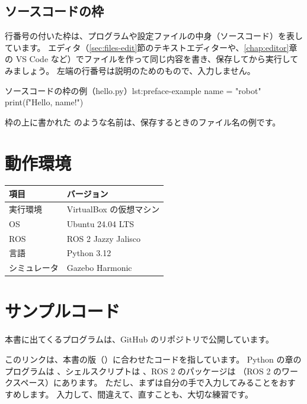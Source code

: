 \subsection*{ソースコードの枠}

行番号の付いた枠は、プログラムや設定ファイルの中身（ソースコード）を表しています。
エディタ（\ref{sec:files-edit}節のテキストエディターや、\ref{chap:editor}章の VS Code など）でファイルを作って同じ内容を書き、保存してから実行してみましょう。
左端の行番号は説明のためのもので、入力しません。

\begin{codelisting}[style=python]{ソースコードの枠の例（hello.py）}{lst:preface-example}
name = "robot"
print(f"Hello, {name}!")
\end{codelisting}

枠の上に書かれた  のような名前は、保存するときのファイル名の例です。

\section*{動作環境}
\begin{table}[h]
  \centering
  \begin{tabular}{ll}
    \toprule
    項目 & バージョン \\
    \midrule
    実行環境 & VirtualBox の仮想マシン \\
    OS & Ubuntu 24.04 LTS \\
    ROS & ROS 2 Jazzy Jalisco \\
    言語 & Python 3.12 \\
    シミュレータ & Gazebo Harmonic \\
    \bottomrule
  \end{tabular}
\end{table}

\section*{サンプルコード}

本書に出てくるプログラムは、GitHub のリポジトリで公開しています。
\begin{center}
  \codeurl
\end{center}
\ifbooktagged
このリンクは、本書の版（\bookversion）に合わせたコードを指しています。
\fi
Python の章のプログラムは 、シェルスクリプトは 、ROS 2 のパッケージは （ROS 2 のワークスペース）にあります。
ただし、まずは自分の手で入力してみることをおすすめします。
入力して、間違えて、直すことも、大切な練習です。
